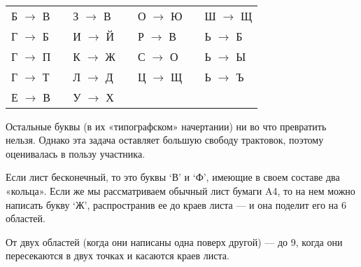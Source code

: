 ﻿
\begin{itemize}

\def\ltr#1{`#1'}

\itA \ 

\begin{center}\begin{tabular}{lllllll}
	Б $\longrightarrow$ В & \quad & З $\longrightarrow$ В & & О $\longrightarrow$ Ю & & Ш $\longrightarrow$ Щ \\
	Г $\longrightarrow$ Б & & И $\longrightarrow$ Й & \quad & Р $\longrightarrow$ В & & Ь $\longrightarrow$ Б \\
	Г $\longrightarrow$ П & & К $\longrightarrow$ Ж & & С $\longrightarrow$ О & \quad & Ь $\longrightarrow$ Ы \\
	Г $\longrightarrow$ Т & & Л $\longrightarrow$ Д & & Ц $\longrightarrow$ Щ & & Ь $\longrightarrow$ Ъ \\
	Е $\longrightarrow$ В & & У $\longrightarrow$ Х
\end{tabular}\end{center}

Остальные буквы (в их «типографском» начертании) ни во что превратить нельзя. Однако эта задача оставляет большую свободу трактовок, поэтому оценивалась в пользу участника.

\itB Если лист бесконечный, то это буквы \ltr В и \ltr Ф, имеющие в своем составе два «кольца». Если же мы рассматриваем обычный лист бумаги A4, то на нем можно написать букву \ltr Ж, распространив ее до краев листа — и она поделит его на 6 областей.

\itC От двух областей (когда они написаны одна поверх другой) — до 9, когда они пересекаются в двух точках и касаются краев листа.
\end{itemize}